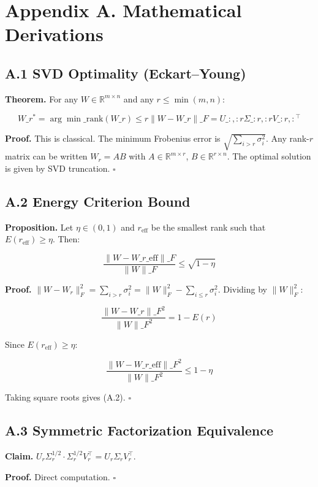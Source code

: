 
\section{Appendix A. Mathematical Derivations}

\subsection{A.1 SVD Optimality (Eckart--Young)}

\textbf{Theorem.} For any $W \in \mathbb{R}^{m \times n}$ and any $r \leq \min(m, n)$:

\[
W\_r^* = \arg\min\_{\text{rank}(W\_r) \leq r} \|W - W\_r\|\_F = U\_{:, :r} \Sigma\_{:r, :r} V\_{:r, :}^\top
\tag{A.1}
\]

\textbf{Proof.} This is classical. The minimum Frobenius error is 
$\sqrt{\sum_{i > r} \sigma_i^2}$. Any rank-$r$ matrix can be written 
$W_r = A B$ with $A \in \mathbb{R}^{m \times r}$, $B \in \mathbb{R}^{r \times n}$. 
The optimal solution is given by SVD truncation. $\square$

\subsection{A.2 Energy Criterion Bound}

\textbf{Proposition.} Let $\eta \in (0, 1)$ and $r_\text{eff}$ be the smallest 
rank such that $E(r_\text{eff}) \geq \eta$. Then:

\[
\frac{\|W - W\_{r\_\text{eff}}\|\_F}{\|W\|\_F} \leq \sqrt{1 - \eta}
\tag{A.2}
\]

\textbf{Proof.} $\|W - W_r\|_F^2 = \sum_{i > r} \sigma_i^2 = \|W\|_F^2 - \sum_{i \leq r} \sigma_i^2$. 
Dividing by $\|W\|_F^2$:

\[
\frac{\|W - W\_r\|\_F^2}{\|W\|\_F^2} = 1 - E(r)
\tag{A.3}
\]

Since $E(r_\text{eff}) \geq \eta$:

\[
\frac{\|W - W\_{r\_\text{eff}}\|\_F^2}{\|W\|\_F^2} \leq 1 - \eta
\tag{A.4}
\]

Taking square roots gives (A.2). $\square$

\subsection{A.3 Symmetric Factorization Equivalence}

\textbf{Claim.} $U_r \Sigma_r^{1/2} \cdot \Sigma_r^{1/2} V_r^\top = U_r \Sigma_r V_r^\top$.

\textbf{Proof.} Direct computation. $\square$

